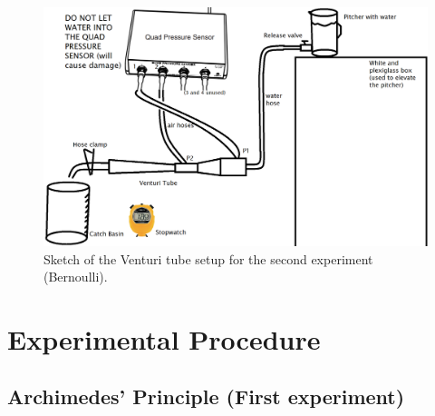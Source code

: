 \begin{figure}[ht]
  \begin{center}
    \includegraphics[width=5.9in]{Fall/Experiment08Figures_Fluids/M08_fig08.png}
  \end{center}
  \caption{Sketch of the Venturi tube setup for the second experiment (Bernoulli).}
  \label{M08_fluids_Fig08}
\end{figure}










\section{Experimental Procedure}


\subsection{Archimedes' Principle (First experiment)}

